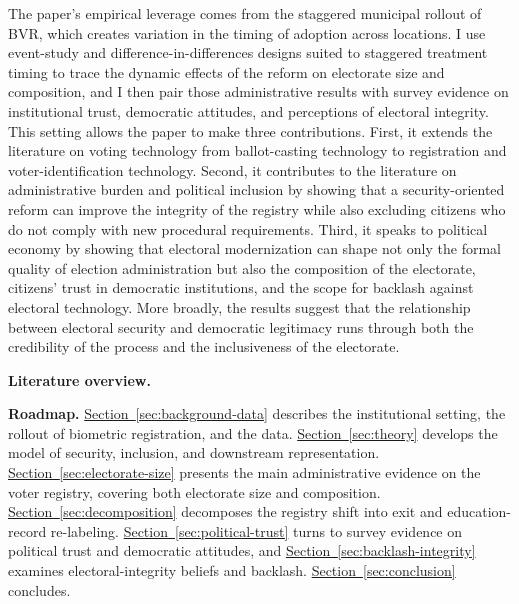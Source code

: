 The paper's empirical leverage comes from the staggered municipal rollout of BVR, which creates variation in the timing of adoption across locations. I use event-study and difference-in-differences designs suited to staggered treatment timing to trace the dynamic effects of the reform on electorate size and composition, and I then pair those administrative results with survey evidence on institutional trust, democratic attitudes, and perceptions of electoral integrity. This setting allows the paper to make three contributions. First, it extends the literature on voting technology from ballot-casting technology to registration and voter-identification technology. Second, it contributes to the literature on administrative burden and political inclusion by showing that a security-oriented reform can improve the integrity of the registry while also excluding citizens who do not comply with new procedural requirements. Third, it speaks to political economy by showing that electoral modernization can shape not only the formal quality of election administration but also the composition of the electorate, citizens' trust in democratic institutions, and the scope for backlash against electoral technology. More broadly, the results suggest that the relationship between electoral security and democratic legitimacy runs through both the credibility of the process and the inclusiveness of the electorate.

\textbf{Literature overview.} 

\textbf{Roadmap.} \hyperref[sec:background-data]{Section~\ref*{sec:background-data}} describes the institutional setting, the rollout of biometric registration, and the data. \hyperref[sec:theory]{Section~\ref*{sec:theory}} develops the model of security, inclusion, and downstream representation. \hyperref[sec:electorate-size]{Section~\ref*{sec:electorate-size}} presents the main administrative evidence on the voter registry, covering both electorate size and composition. \hyperref[sec:decomposition]{Section~\ref*{sec:decomposition}} decomposes the registry shift into exit and education-record re-labeling. \hyperref[sec:political-trust]{Section~\ref*{sec:political-trust}} turns to survey evidence on political trust and democratic attitudes, and \hyperref[sec:backlash-integrity]{Section~\ref*{sec:backlash-integrity}} examines electoral-integrity beliefs and backlash. \hyperref[sec:conclusion]{Section~\ref*{sec:conclusion}} concludes.
